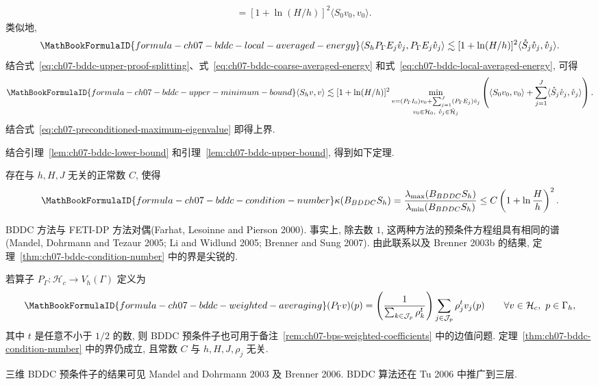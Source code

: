 \begin{Proof}
\begin{align}
&=[1+\ln(H/h)]^2\langle S_0v_0,v_0\rangle.
\label{eq:ch07-bddc-coarse-averaged-energy}
\end{align}
类似地,
\begin{equation}
\MathBookFormulaID{formula-ch07-bddc-local-averaged-energy}
\label{eq:ch07-bddc-local-averaged-energy}
\langle S_hP_\Gamma E_j\mathring v_j,P_\Gamma E_j\mathring v_j\rangle
\lesssim[1+\ln(H/h)]^2
\langle\mathring S_j\mathring v_j,\mathring v_j\rangle.
\end{equation}
结合式~\eqref{eq:ch07-bddc-upper-proof-splitting}、式~\eqref{eq:ch07-bddc-coarse-averaged-energy} 和式~\eqref{eq:ch07-bddc-local-averaged-energy}, 可得
\[
\MathBookFormulaID{formula-ch07-bddc-upper-minimum-bound}
\langle S_hv,v\rangle
\lesssim[1+\ln(H/h)]^2
\min_{\substack{v=(P_\Gamma I_0)v_0+\sum_{j=1}^{J}(P_\Gamma E_j)\mathring v_j\\
v_0\in\mathcal H_0,\ \mathring v_j\in\mathring{\mathcal H}_j}}
\left(\langle S_0v_0,v_0\rangle
+\sum_{j=1}^{J}\langle\mathring S_j\mathring v_j,\mathring v_j\rangle\right).
\]
结合式~\eqref{eq:ch07-preconditioned-maximum-eigenvalue} 即得上界.
\end{Proof}

结合引理~\ref{lem:ch07-bddc-lower-bound} 和引理~\ref{lem:ch07-bddc-upper-bound}, 得到如下定理.

\begin{Theorem}
\label{thm:ch07-bddc-condition-number}
存在与 $h,H,J$ 无关的正常数 $C$, 使得
\[
\MathBookFormulaID{formula-ch07-bddc-condition-number}
\kappa(B_{BDDC}S_h)
=\frac{\lambda_{\max}(B_{BDDC}S_h)}{\lambda_{\min}(B_{BDDC}S_h)}
\leq C\left(1+\ln\frac{H}{h}\right)^2.
\]
\end{Theorem}

\begin{Remark}
\label{rem:ch07-bddc-feti-duality}
BDDC 方法与 FETI-DP 方法对偶(Farhat, Lesoinne and Pierson 2000). 事实上, 除去数 $1$, 这两种方法的预条件方程组具有相同的谱(Mandel, Dohrmann and Tezaur 2005; Li and Widlund 2005; Brenner and Sung 2007). 由此联系以及 Brenner 2003b 的结果, 定理~\ref{thm:ch07-bddc-condition-number} 中的界是尖锐的.
\end{Remark}

\begin{Remark}
\label{rem:ch07-bddc-weighted-coefficients}
若算子 $P_\Gamma:\mathcal H_c\longrightarrow V_h(\Gamma)$ 定义为
\[
\MathBookFormulaID{formula-ch07-bddc-weighted-averaging}
(P_\Gamma v)(p)=
\left(\frac1{\sum_{k\in\mathcal J_p}\rho_k^t}\right)
\sum_{j\in\mathcal J_p}\rho_j^tv_j(p)
\qquad\forall v\in\mathcal H_c,\ p\in\Gamma_h,
\]
其中 $t$ 是任意不小于 $1/2$ 的数, 则 BDDC 预条件子也可用于备注~\ref{rem:ch07-bps-weighted-coefficients} 中的边值问题. 定理~\ref{thm:ch07-bddc-condition-number} 中的界仍成立, 且常数 $C$ 与 $h,H,J,\rho_j$ 无关.
\end{Remark}

\begin{Remark}
\label{rem:ch07-bddc-three-dimensional}
三维 BDDC 预条件子的结果可见 Mandel and Dohrmann 2003 及 Brenner 2006. BDDC 算法还在 Tu 2006 中推广到三层.
\end{Remark}
